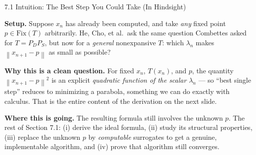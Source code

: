 \documentclass[aspectratio=169,10pt]{beamer}
\newcommand{\norm}[1]{\left\|#1\right\|}
\newcommand{\Fix}{\mathrm{Fix}}
\begin{document}
\begin{frame}{7.1 Intuition: The Best Step You Could Take (In Hindsight)}

  \textbf{Setup.} Suppose $x_n$ has already been computed, and take
  \emph{any} fixed point $p\in\Fix(T)$ arbitrarily. He, Cho, et al.\
  ask the same question Combettes asked for $T=P_DP_S$, but now for
  a \emph{general} nonexpansive $T$: which $\lambda_n$ makes
  $\norm{x_{n+1}-p}$ as small as possible?

  \vspace{0.3em}
  \textbf{Why this is a clean question.} For fixed $x_n$, $T(x_n)$,
  and $p$, the quantity $\norm{x_{n+1}-p}^2$ is an explicit
  \emph{quadratic function of the scalar $\lambda_n$} --- so ``best
  single step'' reduces to minimizing a parabola, something we can
  do exactly with calculus. That is the entire content of the
  derivation on the next slide.

  \vspace{0.3em}
  \textbf{Where this is going.} The resulting formula still involves
  the unknown $p$. The rest of Section 7.1: (i) derive the ideal
  formula, (ii) study its structural properties, (iii) replace the
  unknown $p$ by \emph{computable} surrogates to get a genuine,
  implementable algorithm, and (iv) prove that algorithm still
  converges.

\end{frame}
\end{document}
